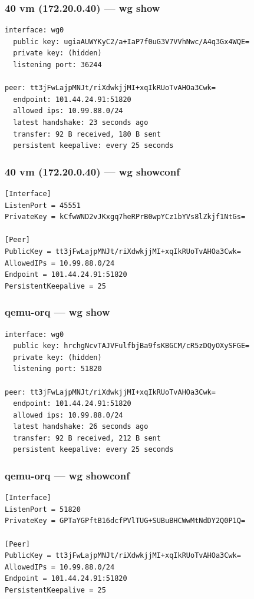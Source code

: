 \documentclass[11pt,a4paper]{article}
\begin{document}
\subsubsection*{40 vm (172.20.0.40) — wg show}
\begin{lstlisting}
interface: wg0
  public key: ugiaAUWYKyC2/a+IaP7f0uG3V7VVhNwc/A4q3Gx4WQE=
  private key: (hidden)
  listening port: 36244

peer: tt3jFwLajpMNJt/riXdwkjjMI+xqIkRUoTvAHOa3Cwk=
  endpoint: 101.44.24.91:51820
  allowed ips: 10.99.88.0/24
  latest handshake: 23 seconds ago
  transfer: 92 B received, 180 B sent
  persistent keepalive: every 25 seconds

\end{lstlisting}

\subsubsection*{40 vm (172.20.0.40) — wg showconf}
\begin{lstlisting}
[Interface]
ListenPort = 45551
PrivateKey = kCfwWND2vJKxgq7heRPrB0wpYCz1bYVs8lZkjf1NtGs=

[Peer]
PublicKey = tt3jFwLajpMNJt/riXdwkjjMI+xqIkRUoTvAHOa3Cwk=
AllowedIPs = 10.99.88.0/24
Endpoint = 101.44.24.91:51820
PersistentKeepalive = 25

\end{lstlisting}

\subsubsection*{qemu-orq — wg show}
\begin{lstlisting}
interface: wg0
  public key: hrchgNcvTAJVFulfbjBa9fsKBGCM/cR5zDQyOXySFGE=
  private key: (hidden)
  listening port: 51820

peer: tt3jFwLajpMNJt/riXdwkjjMI+xqIkRUoTvAHOa3Cwk=
  endpoint: 101.44.24.91:51820
  allowed ips: 10.99.88.0/24
  latest handshake: 26 seconds ago
  transfer: 92 B received, 212 B sent
  persistent keepalive: every 25 seconds

\end{lstlisting}

\subsubsection*{qemu-orq — wg showconf}
\begin{lstlisting}
[Interface]
ListenPort = 51820
PrivateKey = GPTaYGPftB16dcfPVlTUG+SUBuBHCWwMtNdDY2Q0P1Q=

[Peer]
PublicKey = tt3jFwLajpMNJt/riXdwkjjMI+xqIkRUoTvAHOa3Cwk=
AllowedIPs = 10.99.88.0/24
Endpoint = 101.44.24.91:51820
PersistentKeepalive = 25

\end{lstlisting}
\end{document}
